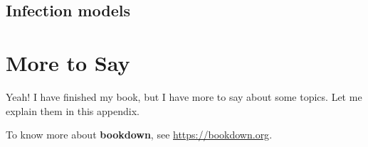 \documentclass[12pt,]{krantz}
\begin{document}
\section{Infection models}\label{infection-models}

\cleardoublepage 

\appendix {}


\chapter{More to Say}\label{more-to-say}

Yeah! I have finished my book, but I have more to say about some topics.
Let me explain them in this appendix.

To know more about \textbf{bookdown}, see \url{https://bookdown.org}.



\printindex
\end{document}
